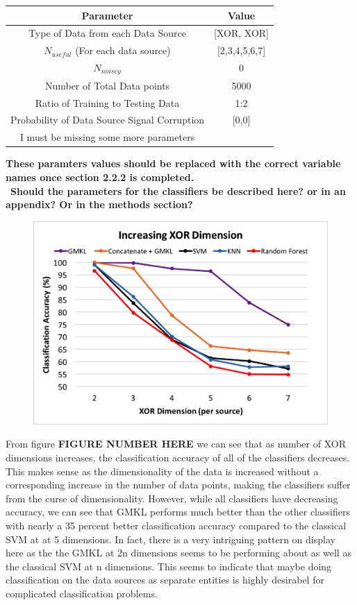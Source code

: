 \documentclass{article}
\begin{document}
\begin{table}[h!]
\centering
 \begin{tabular}{|c c|}
 \hline
Parameter & Value \\
\hline
Type of Data from each Data Source & [XOR, XOR]\\
$N_{useful}$ (For each data source) & [2,3,4,5,6,7] \\
$N_{noisey}$& 0\\
Number of Total Data points & 5000\\
Ratio of Training to Testing Data & 1:2\\
Probability of Data Source Signal Corruption & [0,0]\\
I must be missing some more parameters\\
\hline
 \end{tabular}
\end{table}
\textbf{These paramters values should be replaced with the correct variable
    names once section 2.2.2 is completed. }\\\
\textbf{Should the parameters for the classifiers be described here? or in an
    appendix? Or in the methods section? }
\begin{figure}[h]
\begin{center}
\includegraphics[scale=0.4]{experimentpic1.png}
\end{center}
\end{figure}


From figure \textbf{FIGURE NUMBER HERE} we can see that as number of XOR
dimensions increases, the classification accuracy of all of the classifiers
decreases. This makes sense as the dimensionality of the data is increased
without a corresponding increase in the number of data points, making the
classifiers suffer from the curse of dimensionality. However, while all
classifiers have decreasing accuracy, we can see that GMKL performs much better
than the other classifiers with nearly a 35 percent better classification
accuracy compared to the classical SVM at at 5 dimensions. In fact, there is a
very intriguing pattern on display here as the the GMKL at 2n dimensions seems
to be performing about as well as the classical SVM at n dimensions. This seems
to indicate that maybe doing classification on the data sources as separate
entities is highly desirabel for complicated classification problems.
\end{document}
